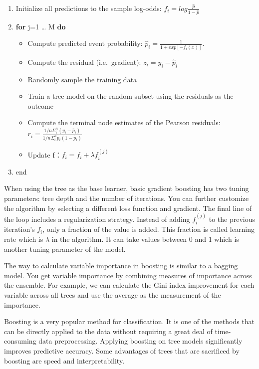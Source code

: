 \documentclass[12pt,]{krantz}
\providecommand{\tightlist}{%
  \setlength{\itemsep}{0pt}\setlength{\parskip}{0pt}}
\begin{document}
\begin{enumerate}
\def\labelenumi{\arabic{enumi}.}
\tightlist
\item
  Initialize all predictions to the sample log-odds: \(f_{i} = log \frac{\hat{p}}{1- \hat{p}}\)
\item
  \textbf{for} j=1 \ldots{} M \textbf{do}

  \begin{itemize}
  \tightlist
  \item
    Compute predicted event probability: \(\hat{p}_i=\frac{1}{1+exp[-f_{i}(x)]}\).
  \item
    Compute the residual (i.e.~gradient): \(z_i=y_i-\hat{p}_i\)
  \item
    Randomly sample the training data
  \item
    Train a tree model on the random subset using the residuals as the outcome
  \item
    Compute the terminal node estimates of the Pearson residuals: \(r_i=\frac{1/n\Sigma_i^n(y_i-\hat{p}_i)}{1/n\Sigma_i^n\hat{p}_i(1-\hat{p}_i)}\)
  \item
    Update f：\(f_i=f_i+\lambda f_i^{(j)}\)
  \end{itemize}
\item
  end
\end{enumerate}

When using the tree as the base learner, basic gradient boosting has two tuning parameters: tree depth and the number of iterations. You can further customize the algorithm by selecting a different loss function and gradient\citep{Hastie2008}. The final line of the loop includes a regularization strategy. Instead of adding \(f_i^{(j)}\) to the previous iteration's \(f_i\), only a fraction of the value is added. This fraction is called learning rate which is \(\lambda\) in the algorithm. It can take values between 0 and 1 which is another tuning parameter of the model.

The way to calculate variable importance in boosting is similar to a bagging model. You get variable importance by combining measures of importance across the ensemble. For example, we can calculate the Gini index improvement for each variable across all trees and use the average as the measurement of the importance.

Boosting is a very popular method for classification. It is one of the methods that can be directly applied to the data without requiring a great deal of time-consuming data preprocessing. Applying boosting on tree models significantly improves predictive accuracy. Some advantages of trees that are sacrificed by boosting are speed and interpretability.
\end{document}
